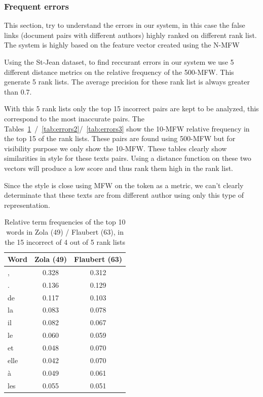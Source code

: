 \subsubsection{Frequent errors}

This section, try to understand the errors in our system, in this case the false links (document pairs with different authors) highly ranked on different rank list.
The system is highly based on the feature vector created using the N-MFW

Using the St-Jean dataset, to find reccurant errors in our system we use 5 different distance metrics on the relative frequency of the 500-MFW.
This generate 5 rank lists.
The average precision for these rank list is always greater than 0.7.

With this 5 rank lists only the top 15 incorrect pairs are kept to be analyzed, this correspond to the most inaccurate pairs.
The Tables~\ref{tab:errors1}~/~\ref{tab:errors2}/~\ref{tab:errors3} show the 10-MFW relative frequency in the top 15 of the rank lists.
These pairs are found using 500-MFW but for visibility purpose we only show the 10-MFW.
These tables clearly show similarities in style for these texts pairs.
Using a distance function on these two vectors will produce a low score and thus rank them high in the rank list.

Since the style is close using MFW on the token as a metric, we can't clearly determinate that these texts are from different author using only this type of representation.

\begin{table}
  \caption{Relative term frequencies of the top 10 words in Zola (49) / Flaubert (63), in the 15 incorrect of 4 out of 5 rank lists}
  \label{tab:errors1}
  \begin{tabular}{|l|c|c|}
      \hline
      Word & Zola (49) & Flaubert (63) \\
      \hline
      , & 0.328 & 0.312 \\
      . & 0.136 & 0.129 \\
      de & 0.117 & 0.103 \\
      la & 0.083 & 0.078 \\
      il & 0.082 & 0.067 \\
      le & 0.060 & 0.059 \\
      et & 0.048 & 0.070 \\
      elle & 0.042 & 0.070 \\
      à & 0.049 & 0.061 \\
      les & 0.055 & 0.051 \\
      \hline
  \end{tabular}
\end{table}

